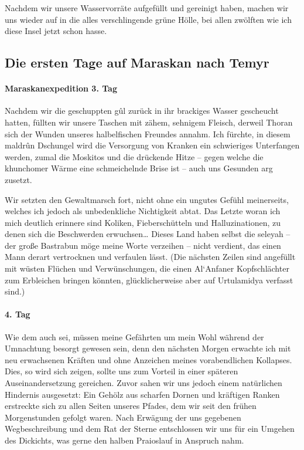Nachdem wir unsere Wasservorräte aufgefüllt und gereinigt haben, machen wir uns wieder auf in die alles verschlingende grüne Hölle, bei allen zwölften wie ich diese Insel jetzt schon hasse.

\subsection{Die ersten Tage auf Maraskan nach Temyr}

\paragraph{Maraskanexpedition 3. Tag}
Nachdem wir die geschuppten gûl zurück in ihr brackiges Wasser gescheucht hatten, füllten wir unsere Taschen mit zähem, sehnigem Fleisch, derweil Thoran sich der Wunden unseres halbelfischen Freundes annahm. Ich fürchte, in diesem maldrûn Dschungel wird die Versorgung von Kranken ein schwieriges Unterfangen werden, zumal die Moskitos und die drückende Hitze -- gegen welche die khunchomer Wärme eine schmeichelnde Brise ist -- auch uns Gesunden arg zusetzt. 

Wir setzten den Gewaltmarsch fort, nicht ohne ein ungutes Gefühl meinerseits, welches ich jedoch als unbedenkliche Nichtigkeit abtat. Das Letzte woran ich mich deutlich erinnere sind Koliken, Fieberschütteln und Halluzinationen, zu denen sich die Beschwerden erwuchsen… Dieses Land haben selbst die seleyah -- der große Bastrabun möge meine Worte verzeihen -- nicht verdient, das einen Mann derart vertrocknen und verfaulen lässt. (Die nächsten Zeilen sind angefüllt mit wüsten Flüchen und Verwünschungen, die einen Al`Anfaner Kopfschlächter zum Erbleichen bringen könnten, glücklicherweise aber auf Urtulamidya verfasst sind.)

\paragraph{4. Tag}
Wie dem auch sei, müssen meine Gefährten um mein Wohl während der Umnachtung besorgt gewesen sein, denn den nächsten Morgen erwachte ich mit neu erwachsenen Kräften und ohne Anzeichen meines vorabendlichen Kollapses. Dies, so wird sich zeigen, sollte uns zum Vorteil in einer späteren Auseinandersetzung gereichen. Zuvor sahen wir uns jedoch einem natürlichen Hindernis ausgesetzt: Ein Gehölz aus scharfen Dornen und kräftigen Ranken erstreckte sich zu allen Seiten unseres Pfades, dem wir seit den frühen Morgenstunden gefolgt waren. Nach Erwägung der uns gegebenen Wegbeschreibung und dem Rat der Sterne entschlossen wir uns für ein Umgehen des Dickichts, was gerne den halben Praioslauf in Anspruch nahm. 

